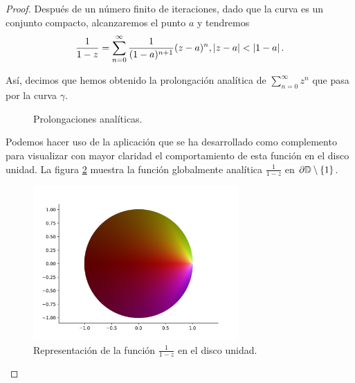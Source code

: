 \begin{proof}
Después de un número finito de iteraciones, dado que la curva es un conjunto compacto, alcanzaremos el punto $a$ y tendremos
\begin{equation*}
    \frac{1}{1-z} = \sum_{n=0}^{\infty} \frac{1}{(1 - a)^{n+1}} (z - a)^n , \left\lvert z - a\right\rvert < \left\lvert1 - a\right\rvert.
\end{equation*}

Así, decimos que hemos obtenido la prolongación analítica de $\sum_{n=0}^{\infty} z^n$ que pasa por la curva $\gamma$. \\

\begin{figure}[!htbp]
    \centering
    \caption{Prolongaciones analíticas.}
    \label{fig:prolongacion}
\end{figure}

Podemos hacer uso de la aplicación que se ha desarrollado como complemento para visualizar con mayor claridad el comportamiento de esta función en el disco unidad. La figura \ref{fig:ejemplo1} muestra la función globalmente analítica $\frac{1}{1-z}$ en $\partial \mathbb{D} \setminus \{1\}$. \\

\begin{figure}[!htbp]
    \centering
    \includegraphics[width=0.7\textwidth]{../Aplicacion/1:(1-z).png}
    \caption{Representación de la función $\frac{1}{1-z}$ en el disco unidad.}
    \label{fig:ejemplo1}
\end{figure}
\end{proof}


